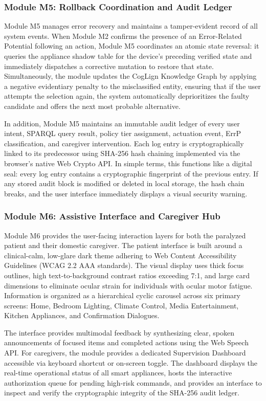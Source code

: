 \documentclass[12pt,a4paper]{report}
\begin{document}
\subsubsection{Module M5: Rollback Coordination and Audit Ledger}
Module M5 manages error recovery and maintains a tamper-evident record of all system events. When Module M2 confirms the presence of an Error-Related Potential following an action, Module M5 coordinates an atomic state reversal: it queries the appliance shadow table for the device's preceding verified state and immediately dispatches a corrective mutation to restore that state. Simultaneously, the module updates the CogLign Knowledge Graph by applying a negative evidentiary penalty to the misclassified entity, ensuring that if the user attempts the selection again, the system automatically deprioritizes the faulty candidate and offers the next most probable alternative.

In addition, Module M5 maintains an immutable audit ledger of every user intent, SPARQL query result, policy tier assignment, actuation event, ErrP classification, and caregiver intervention. Each log entry is cryptographically linked to its predecessor using SHA-256 hash chaining implemented via the browser's native Web Crypto API. In simple terms, this functions like a digital seal: every log entry contains a cryptographic fingerprint of the previous entry. If any stored audit block is modified or deleted in local storage, the hash chain breaks, and the user interface immediately displays a visual security warning.

\subsubsection{Module M6: Assistive Interface and Caregiver Hub}
Module M6 provides the user-facing interaction layers for both the paralyzed patient and their domestic caregiver. The patient interface is built around a clinical-calm, low-glare dark theme adhering to Web Content Accessibility Guidelines (WCAG 2.2 AAA standards). The visual display uses thick focus outlines, high text-to-background contrast ratios exceeding 7:1, and large card dimensions to eliminate ocular strain for individuals with ocular motor fatigue. Information is organized as a hierarchical cyclic carousel across six primary screens: Home, Bedroom Lighting, Climate Control, Media Entertainment, Kitchen Appliances, and Confirmation Dialogues.

The interface provides multimodal feedback by synthesizing clear, spoken announcements of focused items and completed actions using the Web Speech API. For caregivers, the module provides a dedicated Supervision Dashboard accessible via keyboard shortcut or on-screen toggle. The dashboard displays the real-time operational status of all smart appliances, hosts the interactive authorization queue for pending high-risk commands, and provides an interface to inspect and verify the cryptographic integrity of the SHA-256 audit ledger.
\end{document}
